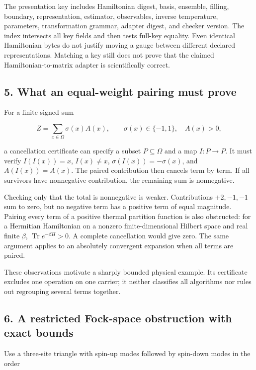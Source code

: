 \documentclass[
  11pt,
]{article}
\begin{document}
The presentation key includes Hamiltonian digest, basis, ensemble,
filling, boundary, representation, estimator, observables, inverse
temperature, parameters, transformation grammar, adapter digest, and
checker version. The index intersects all key fields and then tests
full-key equality. Even identical Hamiltonian bytes do not justify
moving a gauge between different declared representations. Matching a
key still does not prove that the claimed Hamiltonian-to-matrix adapter
is scientifically correct.

\subsection{5. What an equal-weight pairing must
prove}\label{what-an-equal-weight-pairing-must-prove}

For a finite signed sum

\[
Z=\sum_{x\in\Omega}\sigma(x)A(x),\qquad
\sigma(x)\in\{-1,1\},\quad A(x)>0,
\]

a cancellation certificate can specify a subset \(P\subseteq\Omega\) and
a map \(I:P\to P\). It must verify \(I(I(x))=x\), \(I(x)\neq x\),
\(\sigma(I(x))=-\sigma(x)\), and \(A(I(x))=A(x)\). The paired
contribution then cancels term by term. If all survivors have
nonnegative contribution, the remaining sum is nonnegative.

Checking only that the total is nonnegative is weaker. Contributions
\(+2,-1,-1\) sum to zero, but no negative term has a positive term of
equal magnitude. Pairing every term of a positive thermal partition
function is also obstructed: for a Hermitian Hamiltonian on a nonzero
finite-dimensional Hilbert space and real finite \(\beta\),
\(\operatorname{Tr}e^{-\beta H}>0\). A complete cancellation would give
zero. The same argument applies to an absolutely convergent expansion
when all terms are paired.

These observations motivate a sharply bounded physical example. Its
certificate excludes one operation on one carrier; it neither classifies
all algorithms nor rules out regrouping several terms together.

\subsection{6. A restricted Fock-space obstruction with exact
bounds}\label{a-restricted-fock-space-obstruction-with-exact-bounds}

Use a three-site triangle with spin-up modes followed by spin-down modes
in the order
\end{document}
